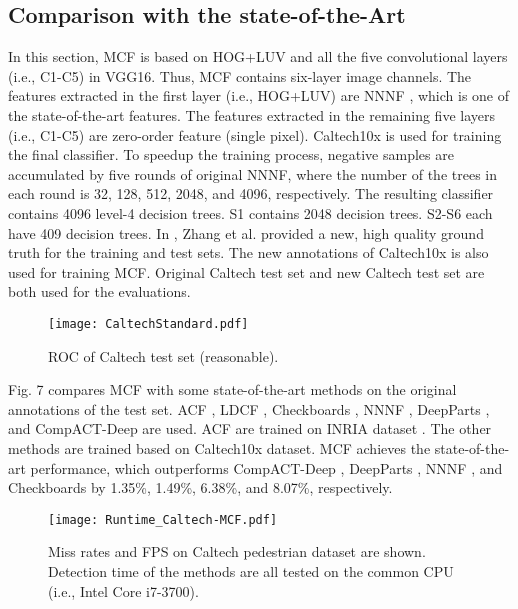 \documentclass[journal]{IEEEtran}
\begin{document}
\subsection{Comparison with the state-of-the-Art}
In this section, MCF is based on HOG+LUV and all the five convolutional layers (i.e., C1-C5) in VGG16. Thus, MCF contains six-layer image channels. The features extracted in the first layer (i.e., HOG+LUV) are NNNF \cite{Cao_NNNF_arXiv_2015}, which is one of the state-of-the-art features. The features extracted in the remaining five layers (i.e., C1-C5) are zero-order feature (single pixel). Caltech10x is used for training the final classifier. To speedup the training process, negative samples are accumulated by five rounds of original NNNF, where the number of the trees in each round is 32, 128, 512, 2048, and 4096, respectively. The resulting classifier contains 4096 level-4 decision trees. S1 contains 2048 decision trees. S2-S6 each have 409 decision trees. In \cite{Zhang_RotatedFilters_arXiv_2016}, Zhang et al. provided a new, high quality ground truth for the training and test sets. The new annotations of Caltech10x is also used for training MCF. Original Caltech test set and new Caltech test set are both used for the evaluations.

\begin{figure}[!t]
\label{CaltechStandard}
\centering
\texttt{[image: CaltechStandard.pdf]}
\caption{ROC of Caltech test set (reasonable).} 
\end{figure}

Fig. 7 compares MCF with some state-of-the-art methods on the original annotations of the test set. ACF \cite{Dollar_ACF_PAMI_2014}, LDCF \cite{Nam_LDCF_NIPS_2014}, Checkboards \cite{Zhang_FCF_CVPR_2015}, NNNF \cite{Cao_NNNF_arXiv_2015}, DeepParts \cite{Tian_DeepParts_ICCV_2015}, and CompACT-Deep \cite{Cai_CompACT_ICCV_2015} are used. ACF \cite{Dollar_ICF_BMVC_2009} are trained on INRIA dataset \cite{Dalal_HOG_CVPR_2005}. The other methods are trained based on Caltech10x dataset. MCF achieves the state-of-the-art performance, which outperforms CompACT-Deep \cite{Cai_CompACT_ICCV_2015}, DeepParts \cite{Tian_DeepParts_ICCV_2015}, NNNF \cite{Cao_NNNF_arXiv_2015}, and Checkboards \cite{Zhang_FCF_CVPR_2015} by 1.35\%, 1.49\%, 6.38\%, and 8.07\%, respectively.


\begin{figure}[!t]
\label{RunTime}
\centering
\texttt{[image: Runtime\_Caltech-MCF.pdf]}
\caption{Miss rates and FPS on Caltech pedestrian dataset are shown. Detection time of the methods are all tested on the common CPU (i.e., Intel Core i7-3700).} 
\end{figure}
\end{document}

